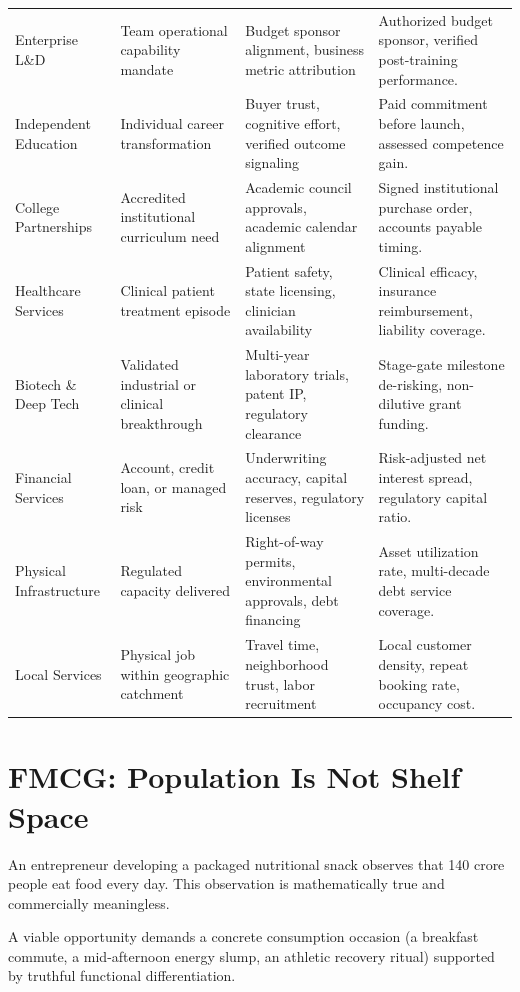 \begin{table}[t!]
\begin{tabularx}{\textwidth}{>{\bfseries\raggedright\arraybackslash}p{2.3cm} >{\raggedright\arraybackslash}p{3.2cm} >{\raggedright\arraybackslash}p{4.2cm} X}
\addlinespace[1.5pt]
Enterprise L\&D & Team operational capability mandate & Budget sponsor alignment, business metric attribution & Authorized budget sponsor, verified post-training performance. \\
\addlinespace[1.5pt]
Independent Education & Individual career transformation & Buyer trust, cognitive effort, verified outcome signaling & Paid commitment before launch, assessed competence gain. \\
\addlinespace[1.5pt]
College Partnerships & Accredited institutional curriculum need & Academic council approvals, academic calendar alignment & Signed institutional purchase order, accounts payable timing. \\
\addlinespace[1.5pt]
Healthcare Services & Clinical patient treatment episode & Patient safety, state licensing, clinician availability & Clinical efficacy, insurance reimbursement, liability coverage. \\
\addlinespace[1.5pt]
Biotech \& Deep Tech & Validated industrial or clinical breakthrough & Multi-year laboratory trials, patent IP, regulatory clearance & Stage-gate milestone de-risking, non-dilutive grant funding. \\
\addlinespace[1.5pt]
Financial Services & Account, credit loan, or managed risk & Underwriting accuracy, capital reserves, regulatory licenses & Risk-adjusted net interest spread, regulatory capital ratio. \\
\addlinespace[1.5pt]
Physical Infrastructure & Regulated capacity delivered & Right-of-way permits, environmental approvals, debt financing & Asset utilization rate, multi-decade debt service coverage. \\
\addlinespace[1.5pt]
Local Services & Physical job within geographic catchment & Travel time, neighborhood trust, labor recruitment & Local customer density, repeat booking rate, occupancy cost. \\
\bottomrule
\end{tabularx}
\end{table}

\section{FMCG: Population Is Not Shelf Space}

An entrepreneur developing a packaged nutritional snack observes that 140 crore people eat food every day. This observation is mathematically true and commercially meaningless.

A viable opportunity demands a concrete consumption occasion (a breakfast commute, a mid-afternoon energy slump, an athletic recovery ritual) supported by truthful functional differentiation.

